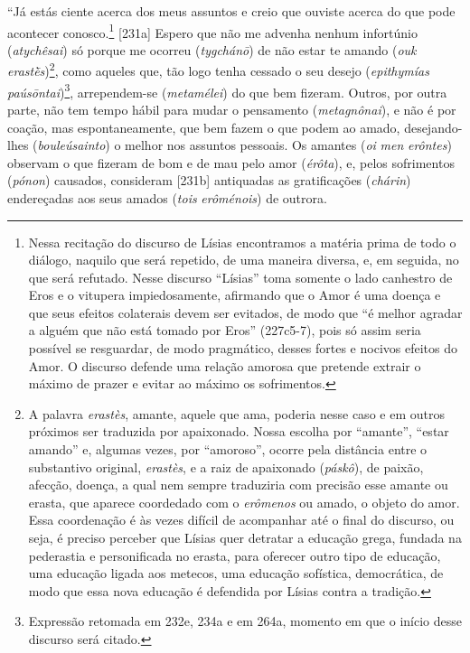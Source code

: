 ``Já estás ciente acerca dos meus assuntos e creio que ouviste acerca do
que pode acontecer conosco.\footnote{Nessa recitação do discurso de
  Lísias encontramos a matéria prima de todo o diálogo, naquilo que será
  repetido, de uma maneira diversa, e, em seguida, no que será refutado.
  Nesse discurso ``Lísias'' toma somente o lado canhestro de Eros e o
  vitupera impiedosamente, afirmando que o Amor é uma doença e que seus
  efeitos colaterais devem ser evitados, de modo que ``é melhor agradar
  a alguém que não está tomado por Eros'' (227c5-7), pois só assim seria
  possível se resguardar, de modo pragmático, desses fortes e nocivos
  efeitos do Amor. O discurso defende uma relação amorosa que pretende
  extrair o máximo de prazer e evitar ao máximo os sofrimentos.}
{[}231a{]} Espero que não me advenha nenhum infortúnio
(\emph{atychêsai}) só porque me ocorreu (\emph{tygchánō}) de não estar
te amando (\emph{ouk} \emph{erastḕs})\footnote{A palavra \emph{erastès},
  amante, aquele que ama, poderia nesse caso e em outros próximos ser
  traduzida por apaixonado. Nossa escolha por ``amante'', ``estar
  amando'' e, algumas vezes, por ``amoroso'', ocorre pela distância
  entre o substantivo original, \emph{erastès}, e a raiz de apaixonado
  (\emph{páskô}), de paixão, afecção, doença, a qual nem sempre
  traduziria com precisão esse amante ou erasta, que aparece coordedado
  com o \emph{erômenos} ou amado, o objeto do amor. Essa coordenação é
  às vezes difícil de acompanhar até o final do discurso, ou seja, é
  preciso perceber que Lísias quer detratar a educação grega, fundada na
  pederastia e personificada no erasta, para oferecer outro tipo de
  educação, uma educação ligada aos metecos, uma educação sofística,
  democrática, de modo que essa nova educação é defendida por Lísias
  contra a tradição.}, como aqueles que, tão logo tenha cessado o seu
desejo (\emph{epithymías paúsōntai})\footnote{Expressão retomada em
  232e, 234a e em 264a, momento em que o início desse discurso será
  citado.}, arrependem-se (\emph{metamélei}) do que bem fizeram. Outros,
por outra parte, não tem tempo hábil para mudar o pensamento
(\emph{metagnônai}), e não é por coação, mas espontaneamente, que bem
fazem o que podem ao amado, desejando-lhes (\emph{bouleúsainto}) o
melhor nos assuntos pessoais. Os amantes (\emph{oi} \emph{men}
\emph{erôntes}) observam o que fizeram de bom e de mau pelo amor
(\emph{érôta}), e, pelos sofrimentos (\emph{pónon}) causados, consideram
{[}231b{]} antiquadas as gratificações (\emph{chárin}) endereçadas aos
seus amados (\emph{tois} \emph{erôménois}) de outrora.

